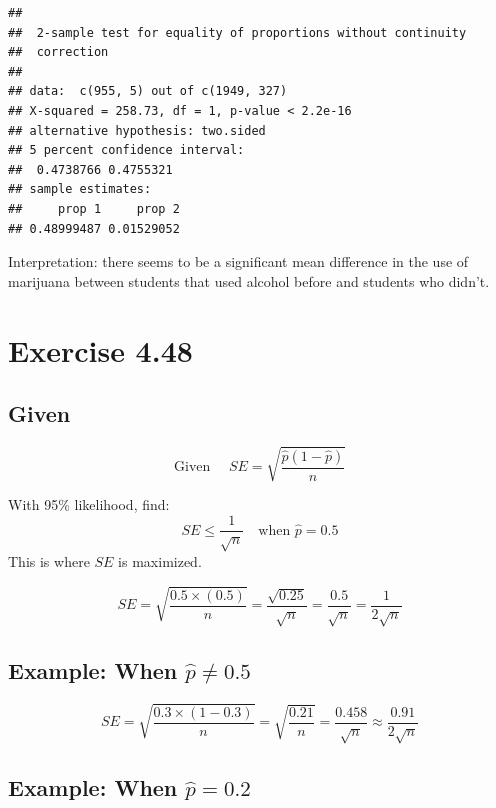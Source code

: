 \documentclass[
]{article}
\begin{document}
\begin{verbatim}
## 
##  2-sample test for equality of proportions without continuity
##  correction
## 
## data:  c(955, 5) out of c(1949, 327)
## X-squared = 258.73, df = 1, p-value < 2.2e-16
## alternative hypothesis: two.sided
## 5 percent confidence interval:
##  0.4738766 0.4755321
## sample estimates:
##     prop 1     prop 2 
## 0.48999487 0.01529052
\end{verbatim}

Interpretation: there seems to be a significant mean difference in the
use of marijuana between students that used alcohol before and students
who didn't.

\hypertarget{exercise-4.48}{%
\section{Exercise 4.48}\label{exercise-4.48}}

\hypertarget{given}{%
\subsection{Given}\label{given}}

\[
\text{Given } \quad SE = \sqrt{\frac{\hat{p}(1 - \hat{p})}{n}}
\]

With 95\% likelihood, find: \[ 
SE \leq \frac{1}{\sqrt{n}} \quad \text{when } \hat{p} = 0.5 
\] This is where \(SE\) is maximized.

\[
SE = \sqrt{\frac{0.5 \times (0.5)}{n}} = \frac{\sqrt{0.25}}{\sqrt{n}} = \frac{0.5}{\sqrt{n}} = \frac{1}{2 \sqrt{n}}
\]

\hypertarget{example-when-hatp-neq-0.5}{%
\subsection{\texorpdfstring{Example: When
\(\hat{p} \neq 0.5\)}{Example: When \textbackslash hat\{p\} \textbackslash neq 0.5}}\label{example-when-hatp-neq-0.5}}

\[
SE = \sqrt{\frac{0.3 \times (1 - 0.3)}{n}} = \sqrt{\frac{0.21}{n}} = \frac{0.458}{\sqrt{n}} \approx \frac{0.91}{2\sqrt{n}}
\]

\hypertarget{example-when-hatp-0.2}{%
\subsection{\texorpdfstring{Example: When
\(\hat{p} = 0.2\)}{Example: When \textbackslash hat\{p\} = 0.2}}\label{example-when-hatp-0.2}}
\end{document}
